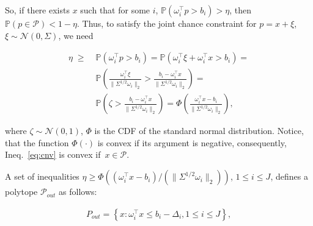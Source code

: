 So, if there exists $x$ such that for some $i$, $\mathbb{P}(\omega_i^\top p > b_i) > \eta$, then $\mathbb{P}(p\in \mathcal{P}) < 1-\eta$. Thus, to satisfy the joint chance constraint for $p = x+\xi$, $\xi\sim \mathcal{N}(0, \Sigma)$, we need

\begin{align}
  \eta \;\ge\; & \mathbb{P}(\omega_i^\top p > b_i) = \mathbb{P}(\omega_i^\top \xi + \omega_i^\top x > b_i) = \nonumber\\
  & 
  \mathbb{P}\left(\frac{\omega_i^\top \xi}{\|\Sigma^{1/2}\omega_i\|_2} > \frac{b_i - \omega_i^\top x}{\|\Sigma^{1/2}\omega_i\|_2}\right) = \nonumber\\
  & \mathbb{P}\left(\zeta > \frac{b_i - \omega_i^\top x}{\|\Sigma^{1/2}\omega_i\|_2}\right) = \Phi\left(\frac{\omega_i^\top x - b_i}{\|\Sigma^{1/2}\omega_i\|_2}\right), \label{eq:cnv}
\end{align}

where $\zeta\sim \mathcal{N}(0,1)$, $\Phi$ is the CDF of the standard normal distribution. Notice, that the function $\Phi(\cdot)$ is convex if its argument is negative, consequently, Ineq.~\eqref{eq:cnv} is convex if~$x\in \mathcal{P}$. 

A set of inequalities $\eta \ge \Phi\left((\omega_i^\top x - b_i)/(\|\Sigma^{1/2}\omega_i\|_2)\right)$, $1\le i \le J$, defines a polytope $\mathcal{P}_{out}$ as follows: 

\begin{align}\label{eq:05}
  P_{out} = \left\{x: \omega_i^\top x \le b_i - \Delta_i, 1\leq i\leq J\right\},
\end{align}

